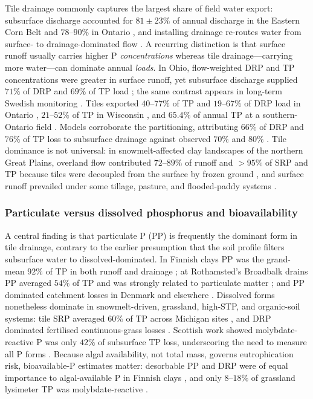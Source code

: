 \documentclass[11pt]{article}
\begin{document}
Tile drainage commonly captures the largest share of field water export:
subsurface discharge accounted for $81\pm23\%$ of annual discharge in the
Eastern Corn Belt \parencite{Pease2018} and $78$--$90\%$ in Ontario
\parencite{VanEsbroeck2016}, and installing drainage re-routes water from
surface- to drainage-dominated flow \parencite{Turtola1995,BENGTSON1995}. A
recurring distinction is that surface runoff usually carries higher P
\emph{concentrations} whereas tile drainage---carrying more water---can
dominate annual \emph{loads}. In Ohio, flow-weighted DRP and TP
concentrations were greater in surface runoff, yet subsurface discharge
supplied $71\%$ of DRP and $69\%$ of TP load \parencite{Pease2018}; the same
contrast appears in long-term Swedish monitoring \parencite{Norberg2022}.
Tiles exported $40$--$77\%$ of TP and $19$--$67\%$ of DRP load in Ontario
\parencite{VanEsbroeck2016}, $21$--$52\%$ of TP in Wisconsin
\parencite{Madison2014}, and $65.4\%$ of annual TP at a southern-Ontario
field \parencite{Qi2018}. Models corroborate the partitioning, attributing
$66\%$ of DRP and $76\%$ of TP loss to subsurface drainage against observed
$70\%$ and $80\%$ \parencite{Grewal2025,Sadhukhan2019b}. Tile dominance is
not universal: in snowmelt-affected clay landscapes of the northern Great
Plains, overland flow contributed $72$--$89\%$ of runoff and $>95\%$ of SRP
and TP because tiles were decoupled from the surface by frozen ground
\parencite{Kokulan2019b,Kokulan2021}, and surface runoff prevailed under
some tillage, pasture, and flooded-paddy systems
\parencite{Zhao2001,Melland2008,DarziNaftchali2016}.

\subsubsection{Particulate versus dissolved phosphorus and bioavailability}

A central finding is that particulate P (PP) is frequently the dominant form
in tile drainage, contrary to the earlier presumption that the soil profile
filters subsurface water to dissolved-dominated. In Finnish clays PP was the
grand-mean $92\%$ of TP in both runoff and drainage \parencite{Uusitalo2001};
at Rothamsted's Broadbalk drains PP averaged $54\%$ of TP and was strongly
related to particulate matter \parencite{Lu2003,Lu2004}; and PP dominated
catchment losses in Denmark and elsewhere
\parencite{Grant1996,Brendel2019,vanderSalm2012}. Dissolved forms
nonetheless dominate in snowmelt-driven, grassland, high-STP, and
organic-soil systems: tile SRP averaged $60\%$ of TP across Michigan sites
\parencite{Clement2017}, and DRP dominated fertilised continuous-grass losses
\parencite{Zhang2015b}. Scottish work showed molybdate-reactive P was only
$42\%$ of subsurface TP loss, underscoring the need to measure all P forms
\parencite{Hooda1999}. Because algal availability, not total mass, governs
eutrophication risk, bioavailable-P estimates matter: desorbable PP and DRP
were of equal importance to algal-available P in Finnish clays
\parencite{Uusitalo2001,Uusitalo2003}, and only $8$--$18\%$ of grassland
lysimeter TP was molybdate-reactive \parencite{Bilotta2008}.
\end{document}
